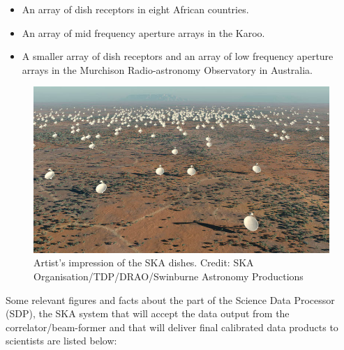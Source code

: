 \begin{itemize}
\item An array of dish receptors in eight African countries. 
\item An array of mid frequency aperture arrays in the Karoo. 
\item A smaller array of dish receptors and an array of low frequency aperture arrays in the Murchison Radio-astronomy Observatory in Australia.
\end{itemize}

 \begin{figure}[tb]
 \centering
 \includegraphics[width=\textwidth]{images/ska.jpg}
 \caption{Artist's impression of the SKA dishes. Credit: SKA Organisation/TDP/DRAO/Swinburne Astronomy Productions}
 \end{figure}


Some relevant figures and facts about the part of the Science Data Processor (SDP), the SKA system that will accept the data output from the correlator/beam-former and that will deliver final calibrated data products to
scientists are listed below:

% 
% 

